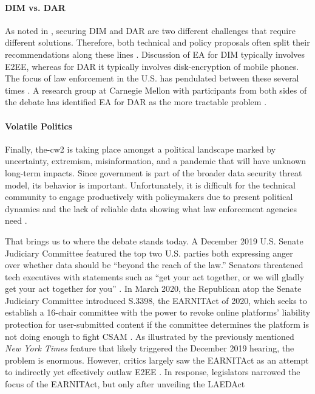 \paragraph*{\ac{DIM} vs. \ac{DAR}} As noted in , securing \acl{DIM} and \acl{DAR} are two
different challenges that require different solutions. Therefore, both technical and policy proposals often split their
recommendations along these lines \cite{group_2019} \cite{owen_law_2018}. Discussion of \ac{EA} for \ac{DIM} typically
involves \ac{E2EE}, whereas for \ac{DAR} it typically involves \ac{disk-encryption} of mobile phones. The focus of law
enforcement in the U.S. has pendulated between these several times \cite{schneier_2019}. A research group at Carnegie
Mellon with participants from both sides of the debate has identified \ac{EA} for \ac{DAR} as the more tractable problem
\cite{group_2019}.

\paragraph*{Volatile Politics} Finally, \ac{the-cw2} is taking place amongst a political landscape marked by
uncertainty, extremism, misinformation, and a pandemic that will have unknown long-term impacts. Since government is
part of the broader data security threat model, its behavior is important. Unfortunately, it is difficult for the
technical community to engage productively with policymakers due to present political dynamics and the lack of reliable
data showing what law enforcement agencies need \cite{granick_2018}.

That brings us to where the debate stands today. A December 2019 U.S. Senate Judiciary Committee featured the top two
U.S. parties both expressing anger over whether data should be ``beyond the reach of the law.'' Senators threatened tech
executives with statements such as ``get your act together, or we will gladly get your act together for you''
\cite{geller_2019}. In March 2020, the Republican atop the Senate Judiciary Committee introduced S.3398, the
\ac{EARNITAct} of 2020, which seeks to establish a 16-chair committee with the power to revoke online platforms'
liability protection for user-submitted content if the committee determines the platform is not doing enough to fight
\ac{CSAM} \cite{graham_s3398_2020}. As illustrated by the previously mentioned \textit{New York Times} feature
\cite{keller_internet_2019} that likely triggered the December 2019 hearing, the problem is enormous. However, critics
largely saw the \ac{EARNITAct} as an attempt to indirectly yet effectively outlaw \ac{E2EE} \cite{newman_2020}
\cite{pfefferkorn_2020}. In response, legislators narrowed the focus of the \ac{EARNITAct}, but only after unveiling the
\ac{LAEDAct}

